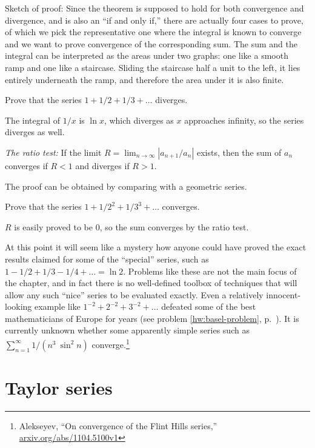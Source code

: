 Sketch of proof: Since the theorem is supposed to hold for both convergence and divergence, and is also an ``if and only if,''
there are actually four cases to prove, of which we pick the representative one where the integral is known to converge and we
want to prove convergence of the corresponding sum.
The sum and the integral can be interpreted as the areas under two graphs: one like a smooth ramp and one like a staircase.
Sliding the staircase half a unit to the left, it lies entirely underneath the ramp, and therefore the area under it is
also finite.

\begin{eg}
\egquestion Prove that the series $1+1/2+1/3+\ldots$ diverges.

\eganswer The integral of $1/x$ is $\ln x$, which diverges as $x$ approaches infinity, so the series diverges as well.
\end{eg}

\emph{The ratio test\/:} If the limit $R=\lim_{n\rightarrow\infty}|a_{n+1}/a_n|$ exists,
then the sum of $a_n$ converges if $R<1$ and diverges if $R>1$.

The proof can be obtained by comparing with a geometric series.

\begin{eg}
\egquestion Prove that the series $1+1/2^2+1/3^3+\ldots$ converges.

\eganswer $R$ is easily proved to be 0, so the sum converges by the ratio test.
\end{eg}

At this point it will seem like a mystery how anyone could have proved the exact results claimed for
some of the ``special'' series, such as $1-1/2+1/3-1/4+\ldots=\ln 2$. Problems like these are not the main
focus of the chapter, and in fact there is no well-defined toolbox of techniques that will allow any such
``nice'' series to be evaluated exactly. Even a relatively innocent-looking example like $1^{-2}+2^{-2}+3^{-2}+\ldots$
defeated some of the best mathematicians of Europe for years (see problem \ref{hw:basel-problem}, p.~\pageref{hw:basel-problem}).
It is currently unknown whether some apparently simple series such as $\sum_{n=1}^\infty 1/(n^3\:\sin^2 n)$ converge.\footnote{Alekseyev,
``On convergence of the Flint Hills series,'' \url{arxiv.org/abs/1104.5100v1}}

\section{Taylor series}\label{sec:taylor}

